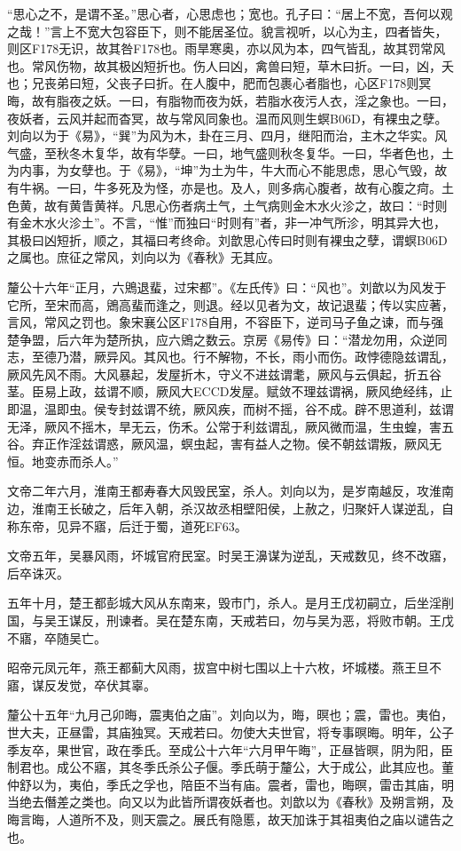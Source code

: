 \documentclass[]{article}
\begin{document}
``思心之不，是谓不圣。''思心者，心思虑也；宽也。孔子曰：``居上不宽，吾何以观之哉！''言上不宽大包容臣下，则不能居圣位。貌言视听，以心为主，四者皆失，则区F178无识，故其咎F178也。雨旱寒奥，亦以风为本，四气皆乱，故其罚常风也。常风伤物，故其极凶短折也。伤人曰凶，禽兽曰短，草木曰折。一曰，凶，夭也；兄丧弟曰短，父丧子曰折。在人腹中，肥而包裹心者脂也，心区F178则冥晦，故有脂夜之妖。一曰，有脂物而夜为妖，若脂水夜污人衣，淫之象也。一曰，夜妖者，云风并起而杳冥，故与常风同象也。温而风则生螟B06D，有裸虫之孽。刘向以为于《易》，``巽''为风为木，卦在三月、四月，继阳而治，主木之华实。风气盛，至秋冬木复华，故有华孽。一曰，地气盛则秋冬复华。一曰，华者色也，土为内事，为女孽也。于《易》，``坤''为土为牛，牛大而心不能思虑，思心气毁，故有牛祸。一曰，牛多死及为怪，亦是也。及人，则多病心腹者，故有心腹之疴。土色黄，故有黄眚黄祥。凡思心伤者病土气，土气病则金木水火沴之，故曰：``时则有金木水火沴土''。不言，``惟''而独曰``时则有''者，非一冲气所沴，明其异大也，其极曰凶短折，顺之，其福曰考终命。刘歆思心传曰时则有裸虫之孽，谓螟B06D之属也。庶征之常风，刘向以为《春秋》无其应。

釐公十六年``正月，六鶂退蜚，过宋都''。《左氏传》曰：``风也''。刘歆以为风发于它所，至宋而高，鶂高蜚而逢之，则退。经以见者为文，故记退蜚；传以实应著，言风，常风之罚也。象宋襄公区F178自用，不容臣下，逆司马子鱼之谏，而与强楚争盟，后六年为楚所执，应六鶂之数云。京房《易传》曰：``潜龙勿用，众逆同志，至德乃潜，厥异风。其风也。行不解物，不长，雨小而伤。政悖德隐兹谓乱，厥风先风不雨。大风暴起，发屋折木，守义不进兹谓耄，厥风与云俱起，折五谷茎。臣易上政，兹谓不顺，厥风大ECCD发屋。赋敛不理兹谓祸，厥风绝经纬，止即温，温即虫。侯专封兹谓不统，厥风疾，而树不摇，谷不成。辟不思道利，兹谓无泽，厥风不摇木，旱无云，伤禾。公常于利兹谓乱，厥风微而温，生虫蝗，害五谷。弃正作淫兹谓惑，厥风温，螟虫起，害有益人之物。侯不朝兹谓叛，厥风无恒。地变赤而杀人。''

文帝二年六月，淮南王都寿春大风毁民室，杀人。刘向以为，是岁南越反，攻淮南边，淮南王长破之，后年入朝，杀汉故丞相壁阳侯，上赦之，归聚奸人谋逆乱，自称东帝，见异不寤，后迁于蜀，道死EF63。

文帝五年，吴暴风雨，坏城官府民室。时吴王濞谋为逆乱，天戒数见，终不改寤，后卒诛灭。

五年十月，楚王都彭城大风从东南来，毁市门，杀人。是月王戊初嗣立，后坐淫削国，与吴王谋反，刑谏者。吴在楚东南，天戒若曰，勿与吴为恶，将败市朝。王戊不寤，卒随吴亡。

昭帝元凤元年，燕王都蓟大风雨，拔宫中树七围以上十六枚，坏城楼。燕王旦不寤，谋反发觉，卒伏其辜。

釐公十五年``九月己卯晦，震夷伯之庙''。刘向以为，晦，暝也；震，雷也。夷伯，世大夫，正昼雷，其庙独冥。天戒若曰。勿使大夫世官，将专事暝晦。明年，公子季友卒，果世官，政在季氏。至成公十六年``六月甲午晦''，正昼皆暝，阴为阳，臣制君也。成公不寤，其冬季氏杀公子偃。季氏萌于釐公，大于成公，此其应也。董仲舒以为，夷伯，季氏之孚也，陪臣不当有庙。震者，雷也，晦暝，雷击其庙，明当绝去僭差之类也。向又以为此皆所谓夜妖者也。刘歆以为《春秋》及朔言朔，及晦言晦，人道所不及，则天震之。展氏有隐慝，故天加诛于其祖夷伯之庙以谴告之也。
\end{document}

